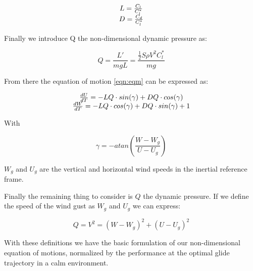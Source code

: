 \begin{equation}
\begin{array}[c]{c}
  L= \frac{C_l}{C_l^*} \\
  D= \frac{C_d}{C_l^*} 
\end{array}
\label{eqn:non_dim_coef}
\end{equation}

\par Finally we introduce Q the non-dimensional dynamic pressure as:

\begin{equation}
  Q = \frac{L'}{mgL} = \frac{\frac{1}{2} S \rho V^{2} C_l^* }{mg}
\label{eqn:dynamic_pressure}
\end{equation}

\par From there the equation of motion \ref{eqn:eqm} can be expressed as:

\begin{equation}
\begin{array}[c]{c}
  \frac{dU}{dT}= -LQ \cdot sin(\gamma) + DQ \cdot cos(\gamma) \\ 
  \frac{dW}{dT}= -LQ \cdot cos(\gamma) + DQ \cdot sin(\gamma) + 1
\end{array}
\label{eqn:non_dim_eqm}
\end{equation}

With 

\begin{equation}
\gamma = -atan(\frac{W-W_g}{U-U_g})
\label{eqn:gamma_def}
\end{equation}
%
%

$W_g$ and $U_g$ are the vertical and horizontal wind speeds in the inertial reference frame.

\par Finally the remaining thing to consider is $Q$ the dynamic pressure. If we define the speed of the wind gust as $W_g$ and $U_g$ we can express:

\begin{equation}
Q = V^2 = (W-W_g)^2 + (U-U_g)^2
\label{eqn:q_def}
\end{equation}

\par With these definitions we have the basic formulation of our non-dimensional equation of motions, normalized by the performance at the optimal glide trajectory in a calm environment.

